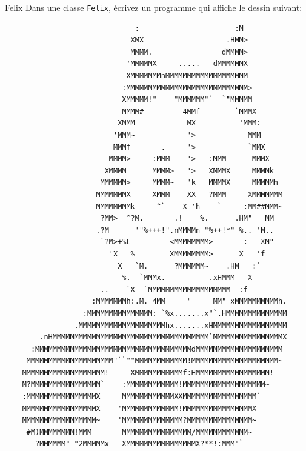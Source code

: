 \documentclass[a4paper,11pt]{article}
\begin{document}
	\newpage
	\begin{Exercice}{Felix}
		Dans une classe \texttt{Felix}, écrivez un programme qui affiche le dessin suivant:

	\begin{verbatim}
	                          :                      :M
	                         XMX                   .HMM>
	                         MMMM.                dMMMM>
	                        'MMMMMX     .....   dMMMMMMX
	                        XMMMMMMMnMMMMMMMMMMMMMMMMMMM
	                       :MMMMMMMMMMMMMMMMMMMMMMMMMMMM>
	                       XMMMMM!"    "MMMMMM"`  `"MMMMM
	                       MMMM#         4MMf        `MMMX
	                      XMMM            MX          'MMM:
	                     'MMM~            '>            MMM
	                     MMMf       .     '>            `MMX
	                    MMMM>     :MMM    '>   :MMM      MMMX
	                   XMMMM      MMMM>   '>   XMMMX     MMMMk
	                  MMMMMM>     MMMM~   'k   MMMMX     MMMMMh
	                 MMMMMMMX     XMMM    XX   ?MMM     XMMMMMMM
	                 MMMMMMMMk     ^`    X 'h    `     :MM##MMM~
	                  ?MM>  ^?M.       .!    %.      .HM"   MM
	                 .?M      '"%+++!".nMMMMn "%++!*" %.. 'M..
	                  `?M>+%L         <MMMMMMMM>       :   XM"
	                    'X   %        XMMMMMMMM>      X   'f
	                      X   `M.      ?MMMMMM~    .HM   :`
	                       %.  `MMMx.          .xHMMM   X
	                  ..    `X  `MMMMMMMMMMMMMMMMMMM  :f
	                :MMMMMMMh:.M. 4MM     "     MM" xMMMMMMMMMMh.
	              :MMMMMMMMMMMMMMM: `%x.......x"`.HMMMMMMMMMMMMMM
	            .MMMMMMMMMMMMMMMMMMMMhx.......xHMMMMMMMMMMMMMMMMM
	    .nHMMMMMMMMMMMMMMMMMMMMMMMMMMMMMMMMMMMM`MMMMMMMMMMMMMMMMX
	  :MMMMMMMMMMMMMMMMMMMMMMMMMMMMMMMMMMMMdMMMMMMMMMMMMMMMMMMMM
	 MMMMMMMMMMMMMMMMMMMM"``""MMMMMMMMMMMM!MMMMMMMMMMMMMMMMMMMM~
	MMMMMMMMMMMMMMMMMMM!     XMMMMMMMMMMMf:HMMMMMMMMMMMMMMMMM!
	M?MMMMMMMMMMMMMMMM`    :MMMMMMMMMMMM!MMMMMMMMMMMMMMMMMMM~
	:MMMMMMMMMMMMMMMMX     MMMMMMMMMMMMXXMMMMMMMMMMMMMMMMM`
	MMMMMMMMMMMMMMMMMX    'MMMMMMMMMMMMM!MMMMMMMMMMMMMMMMX
	MMMMMMMMMMMMMMMMM~    'MMMMMMMMMMMMMM?MMMMMMMMMMMMMMM~
	 #M)MMMMMMMM!MMM       MMMMMMMMMMMMMMMM/MMMMMMMMMMMM~
	   ?MMMMMM"-"2MMMMMx   XMMMMMMMMMMMMMMMMX?**!:MMM"`
	\end{verbatim}
\end{Exercice}
\end{document}
